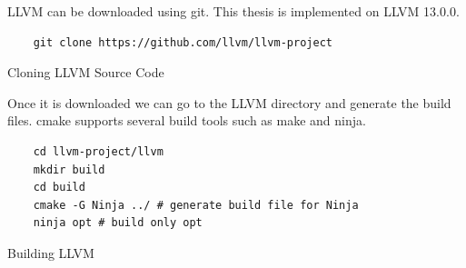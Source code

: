 LLVM can be downloaded using git. This thesis is implemented on LLVM 13.0.0.

\begin{listing}
\begin{verbatim}
    git clone https://github.com/llvm/llvm-project
\end{verbatim}
\caption{Cloning LLVM Source Code}    
\label{listing:2-9}
\end{listing}

Once it is downloaded we can go to the LLVM directory and generate the build files. cmake supports several build tools such as make and ninja. 

\begin{listing}
\begin{verbatim}
    cd llvm-project/llvm
    mkdir build
    cd build
    cmake -G Ninja ../ # generate build file for Ninja
    ninja opt # build only opt
\end{verbatim}
\caption{Building LLVM}    
\label{listing:2-10}
\end{listing}